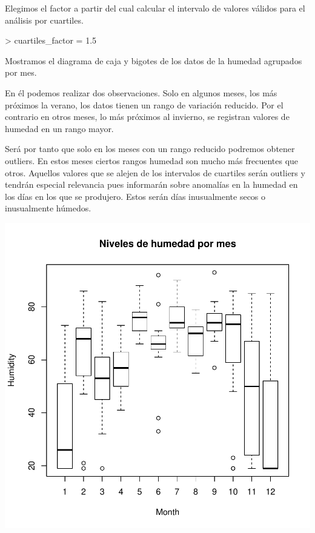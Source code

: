 \documentclass [a4paper] {article}
\begin{document}
Elegimos el factor a partir del cual calcular el intervalo de valores válidos para el análisis por cuartiles.
\begin{Schunk}
\begin{Sinput}
> cuartiles_factor = 1.5
\end{Sinput}
\end{Schunk}

Mostramos el diagrama de caja y bigotes de los datos de la humedad agrupados por mes.

En él podemos realizar dos observaciones.
Solo en algunos meses, los más próximos la verano, los datos tienen un rango de variación reducido.
Por el contrario en otros meses, lo más próximos al invierno, se registran valores de humedad en un rango mayor.

Será por tanto que solo en los meses con un rango reducido podremos obtener outliers.
En estos meses ciertos rangos humedad son mucho más frecuentes que otros.
Aquellos valores que se alejen de los intervalos de cuartiles serán outliers y tendrán especial relevancia pues informarán sobre anomalías en la humedad en los días en los que se produjero.
Estos serán días inusualmente secos o inusualmente húmedos.

\begin{center}
\includegraphics{entrega-datos_humedad_mes_cuart}
\end{center}
\end{document}
